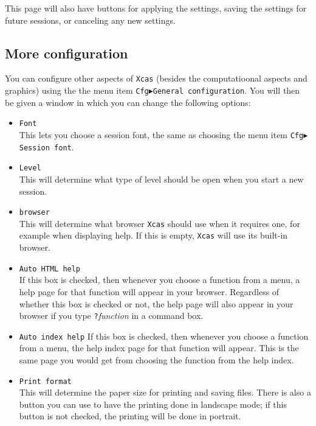 \documentclass[a4paper,11pt]{book}
\begin{document}
This page will also have buttons for applying the settings, saving the
settings for future sessions, or canceling any new settings.

\subsection{More configuration}
\label{sec:mconf}

You can configure other aspects of \texttt{Xcas} (besides the
computatioonal aspects and graphics) using the the menu item 
\texttt{Cfg$\blacktriangleright$General configuration}.
You will then be given a window in which you can
change the following options:
\begin{itemize}
  \item \texttt{Font}\\
  This lets you choose a session font, the same as choosing the menu
  item \texttt{Cfg$\blacktriangleright$Session font}.
  
  \item \texttt{Level}\\
  This will determine what type of level should be open when you start
  a new session.
  
  \item \texttt{browser}\\
  This will determine what browser \texttt{Xcas} should use when it
  requires one, for example when displaying help.  If this is empty,
  \texttt{Xcas} will use its built-in browser.
  
  \item \texttt{Auto HTML help}\\
  If this box is checked, then whenever you choose a function from a menu,
  a help page for that function will appear in your browser.
  Regardless of whether this box is checked or not, the help page will
  also appear in your browser if you type \texttt{?}\textit{function}
  in a command box.
  
  \item \texttt{Auto index help}
  If this box is checked, then whenever you choose a function from a
  menu, the help index page for that function will appear.  This is
  the same page you would get from choosing the function from the help
  index.    

  \item \texttt{Print format}\\
  This will determine the paper size for printing and saving files.
  There is also a button you can use to have the printing done in
  landscape mode; if this button is not checked, the printing will be
  done in portrait.
  

\end{itemize}
\end{document}
